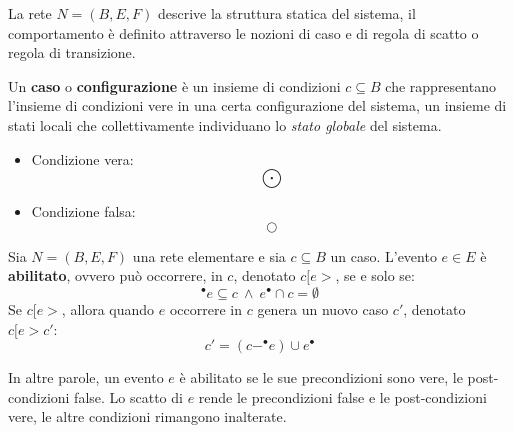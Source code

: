 La rete $N = (B, E, F)$ descrive la struttura statica del sistema, il
comportamento è definito attraverso le nozioni di caso e di regola di scatto o
regola di transizione.

Un \textbf{caso} o \textbf{configurazione} è un insieme di condizioni $c \subseteq B$
che rappresentano l'insieme di condizioni vere in una certa configurazione del
sistema, un insieme di stati locali che collettivamente individuano lo
\textit{stato globale} del sistema.
\begin{itemize}
    \item Condizione vera: $$\bigodot$$
    \item Condizione falsa: $$\bigcirc$$
\end{itemize}
\begin{definizione} 
    Sia $N = (B, E, F)$ una rete elementare e sia $c \subseteq B$ un caso. L'evento
    $e \in E$ è \textbf{abilitato}, ovvero può occorrere, in $c$, denotato
    $c[e >$, se e solo se:
    \begin{equation}
        ^{\bullet} e \subseteq c \ \land \ e^{\bullet} \cap c = \emptyset
    \end{equation}
    Se $c[e >$, allora quando $e$ occorrere in $c$ genera un nuovo caso $c'$,
    denotato $c[e > c'$:
    \begin{equation}
        c' = (c - ^{\bullet} e) \cup e^{\bullet}
    \end{equation}
\end{definizione}
In altre parole, un evento $e$ è abilitato se le sue precondizioni sono vere,
le post-condizioni false. Lo scatto di $e$ rende le precondizioni false e le
post-condizioni vere, le altre condizioni rimangono inalterate.

